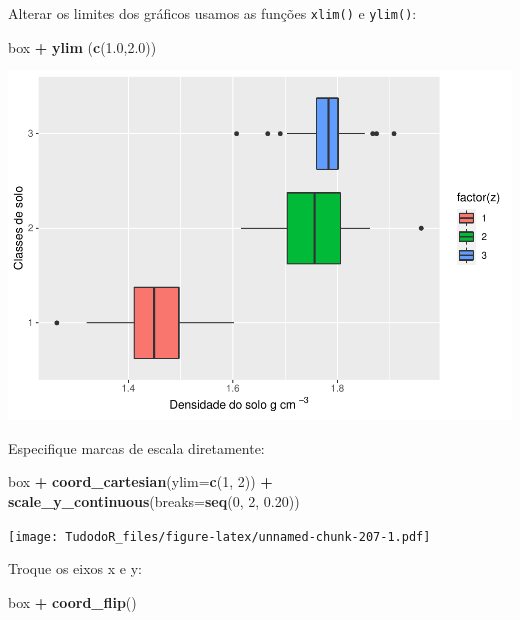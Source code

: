 \documentclass[
]{book}
\newenvironment{Shaded}{\begin{snugshade}}{\end{snugshade}}
\newcommand{\DataTypeTok}[1]{\textcolor[rgb]{0.13,0.29,0.53}{#1}}
\newcommand{\DecValTok}[1]{\textcolor[rgb]{0.00,0.00,0.81}{#1}}
\newcommand{\FloatTok}[1]{\textcolor[rgb]{0.00,0.00,0.81}{#1}}
\newcommand{\KeywordTok}[1]{\textcolor[rgb]{0.13,0.29,0.53}{\textbf{#1}}}
\newcommand{\NormalTok}[1]{#1}
\newcommand{\OperatorTok}[1]{\textcolor[rgb]{0.81,0.36,0.00}{\textbf{#1}}}
\newcommand{\StringTok}[1]{\textcolor[rgb]{0.31,0.60,0.02}{#1}}
\begin{document}
Alterar os limites dos gráficos usamos as funções \texttt{xlim()} e \texttt{ylim()}:

\begin{Shaded}
\begin{Highlighting}[]
\NormalTok{  box }\OperatorTok{+}\StringTok{ }\KeywordTok{ylim}\NormalTok{ (}\KeywordTok{c}\NormalTok{(}\FloatTok{1.0}\NormalTok{,}\FloatTok{2.0}\NormalTok{))}
\end{Highlighting}
\end{Shaded}

\includegraphics{TudodoR_files/figure-latex/unnamed-chunk-206-1.pdf}

Especifique marcas de escala diretamente:

\begin{Shaded}
\begin{Highlighting}[]
\NormalTok{box }\OperatorTok{+}\StringTok{ }\KeywordTok{coord_cartesian}\NormalTok{(}\DataTypeTok{ylim=}\KeywordTok{c}\NormalTok{(}\DecValTok{1}\NormalTok{, }\DecValTok{2}\NormalTok{)) }\OperatorTok{+}\StringTok{ }
\StringTok{    }\KeywordTok{scale_y_continuous}\NormalTok{(}\DataTypeTok{breaks=}\KeywordTok{seq}\NormalTok{(}\DecValTok{0}\NormalTok{, }\DecValTok{2}\NormalTok{, }\FloatTok{0.20}\NormalTok{))  }
\end{Highlighting}
\end{Shaded}

\texttt{[image: TudodoR\_files/figure-latex/unnamed-chunk-207-1.pdf]}

Troque os eixos x e y:

\begin{Shaded}
\begin{Highlighting}[]
\NormalTok{box }\OperatorTok{+}
\StringTok{  }\KeywordTok{coord_flip}\NormalTok{()}
\end{Highlighting}
\end{Shaded}
\end{document}
